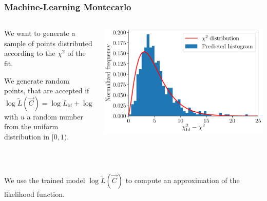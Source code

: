 \documentclass[mathserif, 10pt]{beamer}
\begin{document}
\begin{frame}
    \frametitle{Machine-Learning Montecarlo}
    \begin{columns}
        \begin{column}{0.5\textwidth}
            We want to generate a sample of points distributed according to the $\chi^2$ of the fit.

            We generate random points, that are accepted if
            $$\log \tilde{L}(\vec{C}) = \log L_\mathrm{bf} + \log u\,,$$
            with $u$ a random number from the uniform distribution in $[0,1)$. %
        \end{column}
        \begin{column}{0.5\textwidth}
            \includegraphics[width=\columnwidth]{figures/hist_xgb.pdf}
        \end{column}
    \end{columns}
    
    ~

    We use the trained model $\log\tilde{L}(\vec{C})$ to compute an approximation of the likelihood function.

\end{frame}
\end{document}

